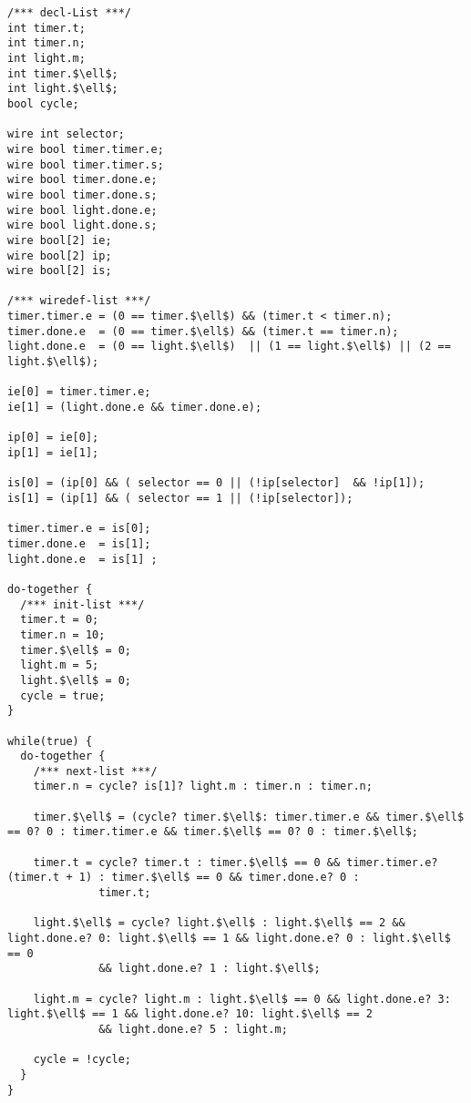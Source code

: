 \begin{lstlisting}
/*** decl-List ***/
int timer.t;
int timer.n;
int light.m;
int timer.$\ell$;
int light.$\ell$;
bool cycle;

wire int selector;
wire bool timer.timer.e;
wire bool timer.timer.s;
wire bool timer.done.e;
wire bool timer.done.s;
wire bool light.done.e;
wire bool light.done.s;
wire bool[2] ie;
wire bool[2] ip;
wire bool[2] is;

/*** wiredef-list ***/
timer.timer.e = (0 == timer.$\ell$) && (timer.t < timer.n);
timer.done.e  = (0 == timer.$\ell$) && (timer.t == timer.n);
light.done.e  = (0 == light.$\ell$)  || (1 == light.$\ell$) || (2 == light.$\ell$);

ie[0] = timer.timer.e;
ie[1] = (light.done.e && timer.done.e);

ip[0] = ie[0];
ip[1] = ie[1];

is[0] = (ip[0] && ( selector == 0 || (!ip[selector]  && !ip[1]);
is[1] = (ip[1] && ( selector == 1 || (!ip[selector]);

timer.timer.e = is[0];
timer.done.e  = is[1];
light.done.e  = is[1] ;
   
do-together {
  /*** init-list ***/
  timer.t = 0; 
  timer.n = 10; 
  timer.$\ell$ = 0;
  light.m = 5; 
  light.$\ell$ = 0;
  cycle = true; 
}

while(true) {
  do-together {
    /*** next-list ***/    
    timer.n = cycle? is[1]? light.m : timer.n : timer.n; 
    
    timer.$\ell$ = (cycle? timer.$\ell$: timer.timer.e && timer.$\ell$ == 0? 0 : timer.timer.e && timer.$\ell$ == 0? 0 : timer.$\ell$;
    
    timer.t = cycle? timer.t : timer.$\ell$ == 0 && timer.timer.e? (timer.t + 1) : timer.$\ell$ == 0 && timer.done.e? 0 : 
              timer.t; 
              
    light.$\ell$ = cycle? light.$\ell$ : light.$\ell$ == 2 && light.done.e? 0: light.$\ell$ == 1 && light.done.e? 0 : light.$\ell$ == 0 
              && light.done.e? 1 : light.$\ell$; 
              
    light.m = cycle? light.m : light.$\ell$ == 0 && light.done.e? 3: light.$\ell$ == 1 && light.done.e? 10: light.$\ell$ == 2 
              && light.done.e? 5 : light.m; 
    
    cycle = !cycle;
  }
}
\end{lstlisting}
